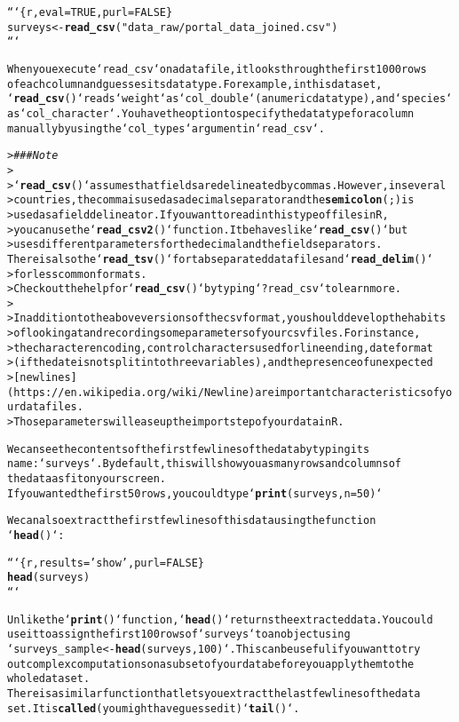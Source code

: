 \documentclass{article}\usepackage[]{graphicx}\usepackage[]{xcolor}
\makeatletter
\newcommand{\hlstr}[1]{\textcolor[rgb]{0.192,0.494,0.8}{#1}}%
\newcommand{\hlcom}[1]{\textcolor[rgb]{0.678,0.584,0.686}{\textit{#1}}}%
\newcommand{\hlkwd}[1]{\textcolor[rgb]{0.737,0.353,0.396}{\textbf{#1}}}%
\newenvironment{kframe}{%
 \def\at@end@of@kframe{}%
 \ifinner\ifhmode%
  \def\at@end@of@kframe{\end{minipage}}%
  \begin{minipage}{\columnwidth}%
 \fi\fi%
 \def\FrameCommand##1{\hskip\@totalleftmargin \hskip-\fboxsep
 \colorbox{shadecolor}{##1}\hskip-\fboxsep
     \hskip-\linewidth \hskip-\@totalleftmargin \hskip\columnwidth}%
 \MakeFramed {\advance\hsize-\width
   \@totalleftmargin\z@ \linewidth\hsize
   \@setminipage}}%
 {\par\unskip\endMakeFramed%
 \at@end@of@kframe}
\newenvironment{knitrout}{}{} %
\makeatother
\begin{document}
\begin{knitrout}
\begin{kframe}
\begin{alltt}
```\{r, eval=TRUE,  purl=FALSE\}
surveys <- \hlkwd{read_csv}(\hlstr{"data_raw/portal_data_joined.csv"})
```

When you execute `read_csv` on a data file, it looks through the first 1000 rows 
of each column and guesses its data type. For example, in this dataset,
`\hlkwd{read_csv}()` reads `weight` as `col_double` (a numeric data type), and `species` 
as `col_character`. You have the option to specify the data type for a column
manually by using the `col_types` argument in `read_csv`.

> \hlcom{### Note}
>
> `\hlkwd{read_csv}()` assumes that fields are delineated by commas. However, in several
> countries, the comma is used as a decimal separator and the \hlkwd{semicolon} (;) is
> used as a field delineator. If you want to read in this type of files in R,
> you can use the `\hlkwd{read_csv2}()` function. It behaves like `\hlkwd{read_csv}()` but
> uses different parameters for the decimal and the field separators. 
There is also the `\hlkwd{read_tsv}()` for tab separated data files and `\hlkwd{read_delim}()` 
> for less common formats.
> Check out the help for `\hlkwd{read_csv}()` by typing `?read_csv` to learn more. 
>
> In addition to the above versions of the csv format, you should develop the habits
> of looking at and recording some parameters of your csv files. For instance, 
> the character encoding, control characters used for line ending, date format
> (if the date is not split into three variables), and the presence of unexpected
> [newlines](https://en.wikipedia.org/wiki/Newline) are important characteristics of your data files.
> Those parameters will ease up the import step of your data in R.

We can see the contents of the first few lines of the data by typing its 
name: `surveys`. By default, this will show you as many rows and columns of
the data as fit on your screen. 
If you wanted the first 50 rows, you could type `\hlkwd{print}(surveys, n = 50)`

We can also extract the first few lines of this data using the function 
`\hlkwd{head}()`:

```\{r, results=\hlstr{'show'}, purl=FALSE\}
\hlkwd{head}(surveys)
```

Unlike the `\hlkwd{print}()` function, `\hlkwd{head}()` returns the extracted data. You could 
use it to assign the first 100 rows of `surveys` to an object using 
`surveys_sample <- \hlkwd{head}(surveys, 100)`. This can be useful if you want to try 
out complex computations on a subset of your data before you apply them to the
whole data set. 
There is a similar function that lets you extract the last few lines of the data 
set. It is \hlkwd{called} (you might have guessed it) `\hlkwd{tail}()`.


\end{alltt}
\end{kframe}
\end{knitrout}
\end{document}
